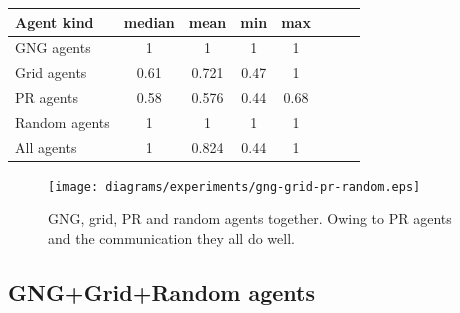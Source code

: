 \begin{center}
  \begin{tabular}{l*{6}{c}r}
  Agent kind        & median & mean & min & max \\
  \hline
  GNG agents        & 1 & 1 & 1 & 1  \\
  Grid agents       & 0.61 & 0.721 & 0.47 & 1  \\   
  PR agents         & 0.58 & 0.576 & 0.44 & 0.68 \\  
  Random agents     & 1 & 1 & 1 & 1  \\
  All agents        & 1 & 0.824 & 0.44 & 1  \\ 
  \end{tabular}                    
\end{center}



\begin{figure}
  \centering                                
  \texttt{[image: diagrams/experiments/gng-grid-pr-random.eps]}    
  \caption{GNG, grid, PR and random agents together. Owing to PR agents and the communication they all do well.}
  \label{experiments:gng-grid-pr-random}
\end{figure}

                                       
\subsection{GNG+Grid+Random agents}
             
